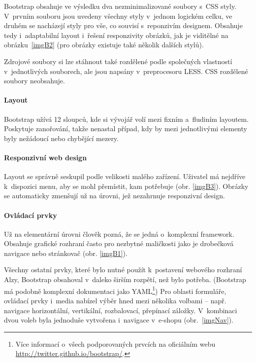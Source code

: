 \documentclass[thesis=B,czech]{FITthesis}[2012/06/26]
\begin{document}
Bootstrap obsahuje ve výsledku dva nezminimalizované soubory s~\gls{CSS} styly. V~prvním souboru jsou uvedeny všechny styly v~jednom logickém celku, ve druhém se nacházejí styly pro vše, co souvisí s~reponzivím designem. Obsahuje tedy i~adaptabilní layout i~řešení responzivity obrázků, jak je viditělné na obrázku~\ref{imgB2} (pro obrázky existuje také několik dalších stylů).

Zdrojové soubory si lze stáhnout také rozdělené podle společných vlastností v~jednotlivých souborech, ale jsou napsány v~preprocesoru LESS. \gls{CSS} rozdělené soubory neobsahuje.


\paragraph{Layout}

Bootstrap užívá 12 sloupců, kde si vývojář volí mezi fixním a~fludiním layoutem. Poskytuje zanořování, takže nenastal případ, kdy by mezi jednotlivými elementy byly nežádoucí nebo chybějící mezery. 

\paragraph{Responzivní web design}

Layout se správně seskupil podle velikosti malého zařízení. Uživatel má nejdříve k~dispozici menu, aby se mohl přemístit, kam potřebuje (obr. \ref{imgB3}). Obrázky se automaticky zmenšují už na úrovni, jež nezahrnuje responzivní design.



\paragraph{Ovládací prvky}

Už na elementární úrovni člověk pozná, že se jedná o~komplexní framework. Obsahuje grafické rozhraní často pro nezbytné maličkosti jako je drobečková navigace nebo stránkovač (obr. \ref{imgB1}).

Všechny ostatní prvky, které bylo nutné použít k~postavení webového rozhraní Alzy, Bootstrap obsahoval v~daleko širším rozpětí, než bylo potřeba. (Bootstrap má podobně komplexní dokumentaci jako \gls{YAML}\footnote{Více informací o~všech podporovaných prvcích na oficiálním webu \\ \url{http://twitter.github.io/bootstrap/}.}) Pro oblasti formuláře, ovládací prvky i~media nabízel výběr hned mezi několika volbami -- např. navigace horizontální, vertikální, rozbalovací, přepínací záložky. V~kombinaci dvou voleb byla jednoduše vytvořena i~navigace v~e-shopu (obr.~\ref{imgNav}).
\end{document}
